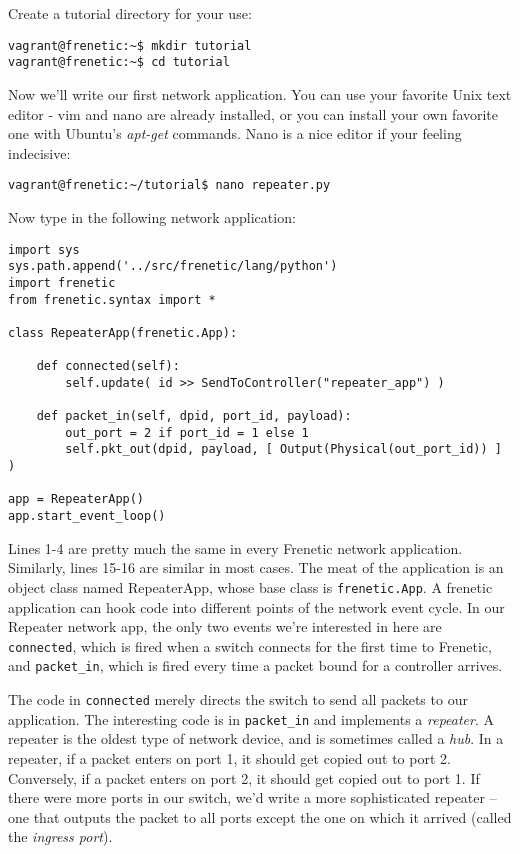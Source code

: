 Create a tutorial directory for your use:

\begin{lstlisting}[style=BashInputStyle]
vagrant@frenetic:~$ mkdir tutorial
vagrant@frenetic:~$ cd tutorial
\end{lstlisting}

Now we'll write our first network application.
You can use your favorite Unix text editor - vim and nano are already installed, or you can install your own favorite
one with Ubuntu's {\it apt-get} commands. 
Nano is a nice editor if your feeling indecisive:

\begin{lstlisting}[style=BashInputStyle]
vagrant@frenetic:~/tutorial$ nano repeater.py
\end{lstlisting}

Now type in the following network application:

\begin{lstlisting}
import sys
sys.path.append('../src/frenetic/lang/python')
import frenetic
from frenetic.syntax import *

class RepeaterApp(frenetic.App):

    def connected(self):
        self.update( id >> SendToController("repeater_app") )

    def packet_in(self, dpid, port_id, payload):
        out_port = 2 if port_id = 1 else 1
        self.pkt_out(dpid, payload, [ Output(Physical(out_port_id)) ] )

app = RepeaterApp()
app.start_event_loop()
\end{lstlisting}

Lines 1-4 are pretty much the same in every Frenetic network application.
Similarly, lines 15-16 are similar in most cases. 
 The meat of the application is an object class named RepeaterApp, whose base class is \lstinline{frenetic.App}.
A frenetic application can hook code into different points of the network event cycle.
In our Repeater network app, the only two events we're interested in here are
\lstinline{connected}, which is fired when a switch connects for the first time to Frenetic, and 
 \lstinline{packet_in}, which is fired every time a packet
bound for a controller arrives.

The code in \lstinline{connected} merely directs the switch to send all packets to our application.
The interesting code is in \lstinline{packet_in} and implements a {\it repeater}.
A repeater is the oldest type of network device, and is sometimes called a {\it hub}. 
In a repeater, if a packet enters on port 1, it should get copied out to port 2.  
Conversely, if a packet enters on port 2, it should get copied out to port 1.
If there were more ports in our switch, we'd write a more sophisticated repeater -- one that
outputs the packet to all ports except the one on which it arrived (called the {\it ingress port}).  

